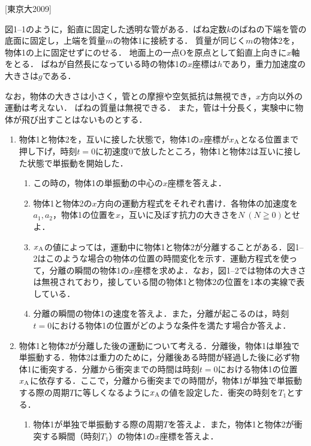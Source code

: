 


\noindent
{} [東京大2009]

図1--1のように，鉛直に固定した透明な管がある．ばね定数$k$のばねの下端を管の底面に固定し，上端を質量$m$の物体1に接続する．
質量が同じく$m$の物体2を，物体1の上に固定せずにのせる．
地面上の一点Oを原点として鉛直上向きに$x$軸をとる．
ばねが自然長になっている時の物体1の$x$座標は$h$であり，重力加速度の大きさは$g$である．

なお，物体の大きさは小さく，管との摩擦や空気抵抗は無視でき，$x$方向以外の運動は考えない．
ばねの質量は無視できる．
また，管は十分長く，実験中に物体が飛び出すことはないものとする．

\begin{enumerate}[label={\textbf{問\arabic*}}]
  \item {\hzw}物体1と物体2を，互いに接した状態で，物体1の$x$座標が$x_\mathrm{A}$となる位置まで押し下げ，時刻$t = 0$に初速度0で放したところ，物体1と物体2は互いに接した状態で単振動を開始した．
  \begin{enumerate}[(1)]
    \item {\hzw}この時の，物体1の単振動の中心の$x$座標を答えよ．
    \item {\hzw}物体1と物体2の$x$方向の運動方程式をそれぞれ書け．各物体の加速度を$a_1, a_2$，物体1の位置を$x$，互いに及ぼす抗力の大きさを$N \ (N \geqq 0)$とせよ．
    \item {\hzw}$x_\mathrm{A}$の値によっては，運動中に物体1と物体2が分離することがある．図1--2はこのような場合の物体の位置の時間変化を示す．運動方程式を使って，分離の瞬間の物体1の$x$座標を求めよ．なお，図1--2では物体の大きさは無視されており，接している間の物体1と物体2の位置を1本の実線で表している．
    \item {\hzw}分離の瞬間の物体1の速度を答えよ．また，分離が起こるのは，時刻$t=0$における物体1の位置がどのような条件を満たす場合か答えよ．
  \end{enumerate}
  \item {\hzw}物体1と物体2が分離した後の運動について考える．分離後，物体1は単独で単振動する．物体2は重力のために，分離後ある時間が経過した後に必ず物体1に衝突する．分離から衝突までの時間は時刻$t = 0$における物体1の位置$x_\mathrm{A}$に依存する．ここで，分離から衝突までの時間が，物体1が単独で単振動する際の周期$T$に等しくなるように$x_\mathrm{A}$の値を設定した．衝突の時刻を$T_1$とする．
  \begin{enumerate}[(1)]
    \item {\hzw}物体1が単独で単振動する際の周期$T$を答えよ．また，物体1と物体2が衝突する瞬間（時刻$T_1$）の物体1の$x$座標を答えよ．

\end{enumerate}
\end{enumerate}
